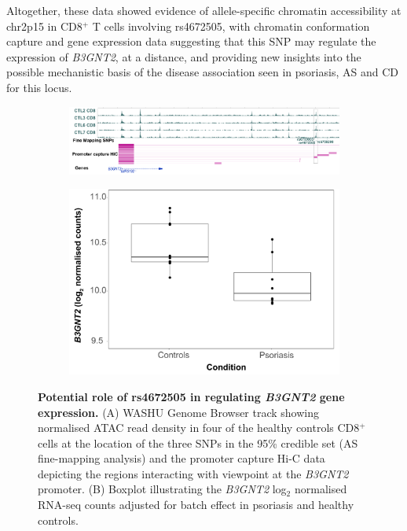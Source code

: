 Altogether, these data showed evidence of allele-specific chromatin accessibility at chr2p15 in CD8$^+$ T cells involving rs4672505, with chromatin conformation capture and gene expression data suggesting that this SNP may regulate the expression of \textit{B3GNT2}, at a distance, and providing new insights into the possible mechanistic basis of the disease association seen in psoriasis, AS and CD for this locus.


\begin{figure}[htbp]
\centering
\begin{subfigure}{0.9\textwidth}
\centering
\includegraphics[width=\textwidth]{./Results2/pdfs/B3GNT2_HiC_WASHU_track}
\caption{\textbf{}}
\end{subfigure}
\begin{subfigure}{0.4\textwidth}
\centering
\includegraphics[width=\textwidth]{./Results2/pdfs/RNA_PS_CTL_B3GNT2_expression_CD8}
\caption{\textbf{}}
\end{subfigure}
\caption[Potential role of rs4672505 in regulating \textit{B3GNT2} gene expression.]{\textbf{Potential role of rs4672505 in regulating \textit{B3GNT2} gene expression.} (A) WASHU Genome Browser track showing normalised ATAC read density in four of the healthy controls CD8$^+$ cells at the location of the three SNPs in the 95\% credible set (AS fine-mapping analysis) and the promoter capture Hi-C data depicting the regions interacting with viewpoint at the \textit{B3GNT2} promoter. (B) Boxplot illustrating the \textit{B3GNT2} log$_2$ normalised RNA-seq counts adjusted for batch effect in psoriasis and healthy controls.}
\label{figure:RNA_chromatin_interaction_B3GNT2}
\end{figure} 






